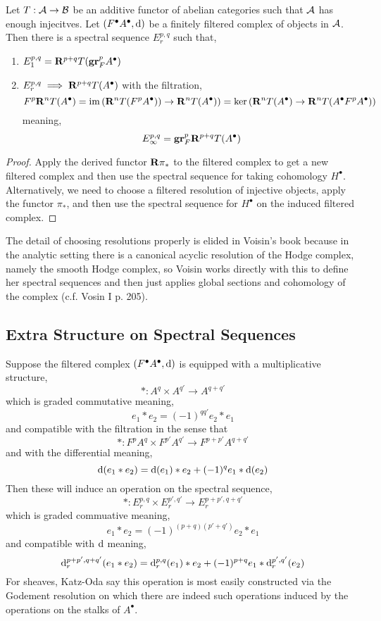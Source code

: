 \documentclass[12pt]{article}
\begin{document}
\begin{prop}
Let $T : \mathcal{A} \to \mathcal{B}$ be an additive functor of abelian categories such that $\mathcal{A}$ has enough injecitves. Let $(F^\bullet A^\bullet, \mathrm{d})$ be a finitely filtered complex of objects in $\mathcal{A}$. Then there is a spectral sequence $E_r^{p,q}$ such that,
\begin{enumerate}
\item $E^{p,q}_1 = \mathbf{R}^{p+q} T(\mathbf{gr}^p_F A^\bullet)$ 
\item $E^{p,q}_r \implies \mathbf{R}^{p+q} T(A^\bullet)$ with the filtration,
\[ F^p \mathbf{R}^n T(A^\bullet) = \operatorname{\mathrm{im}}{(\mathbf{R}^n T(F^p A^\bullet)) \to \mathbf{R}^n T(A^\bullet))} = \ker{(\mathbf{R}^n T(A^\bullet) \to \mathbf{R}^n T (A^\bullet F^p A^\bullet))} \]
meaning,
\[ E^{p,q}_{\infty} = \mathbf{gr}^p_F \mathbf{R}^{p+q} T(A^\bullet) \]
\end{enumerate}
\end{prop}

\begin{proof}
Apply the derived functor $\mathbf{R} \pi_*$ to the filtered complex to get a new filtered complex and then use the spectral sequence for taking cohomology $H^\bullet$. Alternatively, we need to choose a filtered resolution of injective objects, apply the functor $\pi_*$, and then use the spectral sequence for $H^\bullet$ on the induced filtered complex.
\end{proof}

\begin{rmk}
The detail of choosing resolutions properly is elided in Voisin's book because in the analytic setting there is a canonical acyclic resolution of the Hodge complex, namely the smooth Hodge complex, so Voisin works directly with this to define her spectral sequences and then just applies global sections and cohomology of the complex (c.f. Vosin I p. 205).
\end{rmk}

\subsection{Extra Structure on Spectral Sequences}

Suppose the filtered complex $(F^\bullet A^\bullet, \mathrm{d})$ is equipped with a multiplicative structure,
\[ * : A^{q} \times A^{q'} \to A^{q+q'} \]
which is graded commutative meaning,
\[ e_1 * e_2 = (-1)^{q q'} e_2 * e_1 \]
and compatible with the filtration in the sense that 
\[ * : F^{p} A^{q} \times F^{p'} A^{q'} \to F^{p + p'} A^{q + q'} \]
and with the differential meaning,
\[ \mathrm{d}(e_1 * e_2) = \mathrm{d}(e_1) * e_2 + (-1)^{q} e_1 * \mathrm{d}(e_2) \]
Then these will induce an operation on the spectral sequence,
\[ *:  E_r^{p, q} \times E_r^{p', q'} \to E_r^{p + p', q + q'} \]
which is graded commuative meaning,
\[ e_1 * e_2 = (-1)^{(p+q)(p' + q')} e_2 * e_1 \]
and compatible with $\mathrm{d}$ meaning,
\[ \mathrm{d}_r^{p + p', q + q'}(e_1 * e_2) = \mathrm{d}_r^{p,q}(e_1) * e_2 + (-1)^{p + q} e_1 * \mathrm{d}_r^{p', q'}(e_2) \]
For sheaves, Katz-Oda say this operation is most easily constructed via the Godement resolution on which there are indeed such operations induced by the operations on the stalks of $A^\bullet$. 
\end{document}
